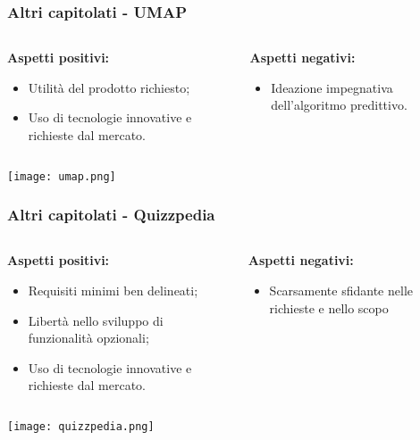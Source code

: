 \begin{frame}
  \frametitle{Altri capitolati - UMAP}
  \begin{columns}
    \begin{column}{0.4\textwidth}
      \par{\textbf{Aspetti positivi:}}
      \begin{itemize}
      \item Utilità del prodotto richiesto;
      \item Uso di tecnologie innovative e richieste dal mercato.
      \end{itemize}
    \end{column}
    \begin{column}{0.4\textwidth}
      \par{\textbf{Aspetti negativi:}}
      \begin{itemize}
      \item Ideazione impegnativa dell'algoritmo predittivo.
      \end{itemize}
    \end{column}
  \end{columns}
  \centering
  \texttt{[image: umap.png]}
\end{frame}

\begin{frame}
  \frametitle{Altri capitolati - Quizzpedia}
  \begin{columns}
    \begin{column}{0.4\textwidth}
      \par{\textbf{Aspetti positivi:}}
      \begin{itemize}
      \item Requisiti minimi ben delineati;
      \item Libertà nello sviluppo di funzionalità opzionali;
      \item Uso di tecnologie innovative e richieste dal mercato.
      \end{itemize}
    \end{column}
    \begin{column}{0.4\textwidth}
      \par{\textbf{Aspetti negativi:}}
      \begin{itemize}
      \item Scarsamente sfidante nelle richieste e nello scopo
      \end{itemize}
    \end{column}
  \end{columns}
  \centering
  \texttt{[image: quizzpedia.png]}
\end{frame}

